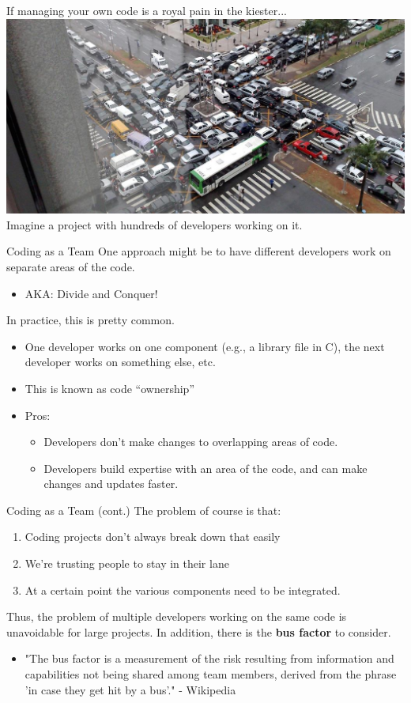\documentclass[11pt]{beamer}
\begin{document}
\begin{frame}
\center
If managing your own code is a royal pain in the kiester... 
\includegraphics[scale=0.3]{gridlock.png} \\
Imagine a project with hundreds of developers working on it.
\end{frame}

\begin{frame}{Coding as a Team}
One approach might be to have different developers work on separate areas of the code.
\begin{itemize}
\item AKA: Divide and Conquer!
\end{itemize}
In practice, this is pretty common.
\begin{itemize}
\item One developer works on one component (e.g., a library file in C), the next developer works on something else, etc.
\item This is known as code ``ownership''
\item Pros:
\begin{itemize}
\item Developers don't make changes to overlapping areas of code. 
\item Developers build expertise with an area of the code, and can make changes and updates faster.
\end{itemize}
\end{itemize}
\end{frame}

\begin{frame}{Coding as a Team (cont.)}
The problem of course is that:
\begin{enumerate}
\item Coding projects don't always break down that easily
\item We're trusting people to stay in their lane
\item At a certain point the various components need to be integrated.
\end{enumerate}
Thus, the problem of multiple developers working on the same code is unavoidable for large projects.  In addition, there is the \textbf{bus factor} to consider.
\begin{itemize}
\item "The bus factor is a measurement of the risk resulting
from information and capabilities not being shared
among team members, derived from the phrase 'in
case they get hit by a bus'." - Wikipedia
\end{itemize}
\end{frame}
\end{document}

